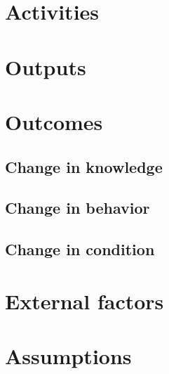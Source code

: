 \documentclass[12pt,letterpaper]{article}
\begin{document}


\section{Activities}


\section{Outputs}


\section{Outcomes}


\subsection{Change in knowledge}


\subsection{Change in behavior}


\subsection{Change in condition}


\section{External factors}


\section{Assumptions}

\end{document}
